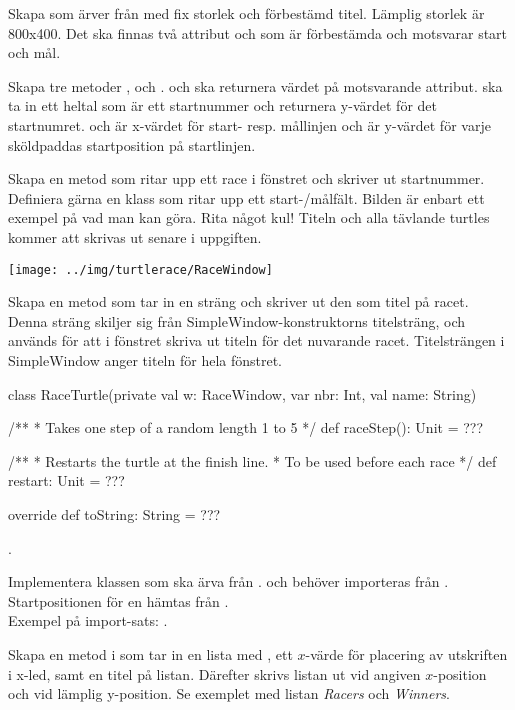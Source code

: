 \Task {}

\Subtask Skapa  som ärver från  med fix storlek och förbestämd titel. Lämplig storlek är 800x400. Det ska finnas två attribut  och  som är förbestämda och motsvarar start och mål.

\Subtask Skapa tre metoder ,  och .  och  ska returnera värdet på motsvarande attribut.  ska ta in ett heltal  som är ett startnummer och returnera y-värdet för det startnumret.  och  är x-värdet för start- resp. mållinjen och  är y-värdet för varje sköldpaddas startposition på startlinjen.

\Subtask Skapa en metod  som ritar upp ett race i fönstret och skriver ut startnummer. Definiera gärna en klass som ritar upp ett start-/målfält. Bilden är enbart ett exempel på vad man kan göra. Rita något kul! Titeln och alla tävlande turtles kommer att skrivas ut senare i uppgiften.

\texttt{[image: ../img/turtlerace/RaceWindow]}

\Subtask Skapa en metod  som tar in en sträng och skriver ut den som titel på racet. Denna sträng skiljer sig från SimpleWindow-konstruktorns titelsträng, och används för att i fönstret skriva ut titeln för det nuvarande racet. Titelsträngen i SimpleWindow anger titeln för hela fönstret.

\begin{Code}
class RaceTurtle(private val w: RaceWindow,
var nbr: Int, val name: String) {
/**
* Takes one step of a random length 1 to 5
*/
def raceStep(): Unit = ???

/**
* Restarts the turtle at the finish line.
* To be used before each race
*/
def restart: Unit = ???

override def toString: String = ???
}
\end{Code}

\Task {}.

\Subtask Implementera klassen  som ska ärva från .  och  behöver importeras från . Startpositionen för en  hämtas från .\\Exempel på import-sats: .

\Subtask Skapa en metod  i  som tar in en lista med , ett $x$-värde för placering av utskriften i x-led, samt en titel på listan. Därefter skrivs listan ut vid angiven $x$-position och vid lämplig y-position. Se exemplet med listan \textit{Racers} och \textit{Winners}.

